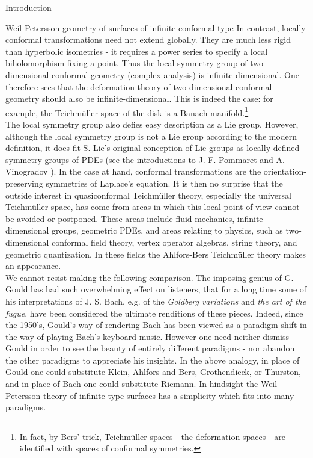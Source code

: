 \documentclass[12pt]{amsart}
\theoremstyle{plain}
\theoremstyle{definition}
\theoremstyle{remark}
\numberwithin{equation}{section} %
\numberwithin{figure}{section} %
\begin{document}
\begin{section}{Introduction}
\begin{subsection}{Weil-Petersson geometry of surfaces of infinite conformal type}
In contrast, locally conformal transformations need not extend globally. They are much less rigid than hyperbolic isometries - it requires a power series to specify a local biholomorphism fixing a point. Thus the local symmetry group of two-dimensional conformal geometry (complex analysis) is infinite-dimensional.   One therefore sees that the deformation theory of two-dimensional conformal geometry should also be infinite-dimensional. This is indeed the case: for example, the Teichm\"uller space of the disk is a Banach manifold.\footnote{  In fact, by Bers' trick, Teichm\"uller spaces - the deformation spaces - are identified with spaces of conformal symmetries.} \\ 

The local symmetry group also defies easy description as a Lie group. However, although the local symmetry group is not a Lie group according to the modern definition, it does fit S. Lie's original conception of Lie groups as locally defined symmetry groups of PDEs (see the introductions to J. F. Pommaret \cite{Pommaret} and A. Vinogradov \cite{Vinogradov}). In the case at hand, conformal transformations are the orientation-preserving symmetries of Laplace's equation. It is then no surprise that the outside interest in quasiconformal Teichm\"uller theory, especially the universal Teichm\"uller space, has come from areas in which this local point of view cannot be avoided or postponed. These areas include fluid mechanics, infinite-dimensional groups, geometric PDEs, and areas relating to physics, such as two-dimensional conformal field theory, vertex operator algebras, string theory, and geometric quantization.  In these fields the Ahlfors-Bers Teichm\"uller theory makes an appearance.\\  

{We cannot resist making the following comparison. The imposing genius of G. Gould has had such overwhelming effect on listeners, that for a long time some of his interpretations of J. S. Bach, e.g. of the \emph{Goldberg variations} and \emph{the art of the fugue}, have been considered the ultimate renditions of these pieces. Indeed, since the 1950's, Gould's way of rendering Bach has been viewed as a paradigm-shift in the way of playing Bach's keyboard music. However one need neither dismiss Gould in order to see the beauty of entirely different paradigms - nor abandon the other paradigms to appreciate his insights. In the above analogy, in place of Gould one could substitute Klein,  Ahlfors {and Bers}, Grothendieck, or Thurston, and in place of Bach one could substitute Riemann.  In hindsight the Weil-Petersson theory of infinite type surfaces has a simplicity which fits into many paradigms.}  
\\


\end{subsection}
\end{section}
\end{document}
